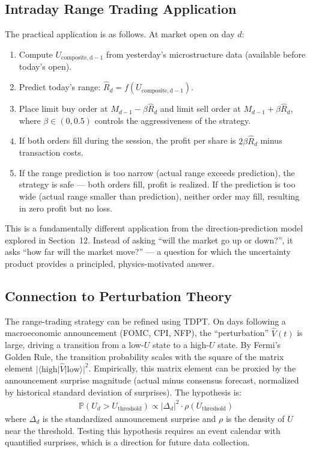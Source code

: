 \documentclass[11pt]{article}
\begin{document}
\subsection{Intraday Range Trading Application}

The practical application is as follows. At market open on day $d$:

\begin{enumerate}
    \item Compute $U_\mathrm{composite,d-1}$ from yesterday's microstructure data (available before today's open).
    \item Predict today's range: $\hat{R}_d = f(U_\mathrm{composite,d-1})$.
    \item Place limit buy order at $M_{d-1} - \beta \hat{R}_d$ and limit sell order at $M_{d-1} + \beta \hat{R}_d$, where $\beta \in (0, 0.5)$ controls the aggressiveness of the strategy.
    \item If both orders fill during the session, the profit per share is $2\beta \hat{R}_d$ minus transaction costs.
    \item If the range prediction is too narrow (actual range exceeds prediction), the strategy is safe --- both orders fill, profit is realized. If the prediction is too wide (actual range smaller than prediction), neither order may fill, resulting in zero profit but no loss.
\end{enumerate}

This is a fundamentally different application from the direction-prediction model explored in Section~12. Instead of asking ``will the market go up or down?'', it asks ``how far will the market move?'' --- a question for which the uncertainty product provides a principled, physics-motivated answer.

\subsection{Connection to Perturbation Theory}

The range-trading strategy can be refined using TDPT. On days following a macroeconomic announcement (FOMC, CPI, NFP), the ``perturbation'' $\hat{V}(t)$ is large, driving a transition from a low-$U$ state to a high-$U$ state. By Fermi's Golden Rule, the transition probability scales with the square of the matrix element $|\langle \mathrm{high}|\hat{V}|\mathrm{low}\rangle|^2$. Empirically, this matrix element can be proxied by the announcement surprise magnitude (actual minus consensus forecast, normalized by historical standard deviation of surprises). The hypothesis is:
\begin{align}
    \mathbb{P}(U_{d} > U_\mathrm{threshold}) \propto |\Delta_d|^2 \cdot \rho(U_\mathrm{threshold})
\end{align}
where $\Delta_d$ is the standardized announcement surprise and $\rho$ is the density of $U$ near the threshold. Testing this hypothesis requires an event calendar with quantified surprises, which is a direction for future data collection.
\end{document}
